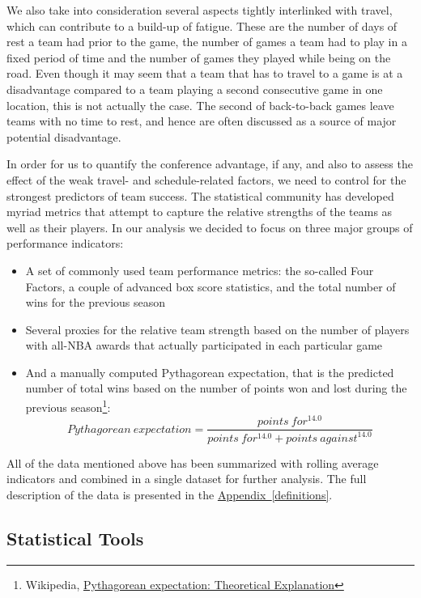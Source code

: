 \documentclass[
    12pt,
    a4paper,
    titlepage,  %
    abstract,  %
    headings=standardclasses,  %
    bibliography=totocnumbered  %
]{scrartcl}
\begin{document}
We also take into consideration several aspects tightly interlinked with travel, which can contribute to a build-up of fatigue. These are the number of days of rest a team had prior to the game, the number of games a team had to play in a fixed period of time and the number of games they played while being on the road. Even though it may seem that a team that has to travel to a game is at a disadvantage compared to a team playing a second consecutive game in one location, this is not actually the case. The second of back-to-back games leave teams with no time to rest, and hence are often discussed as a source of major potential disadvantage.

In order for us to quantify the conference advantage, if any, and also to assess the effect of the weak travel- and schedule-related factors, we need to control for the strongest predictors of team success. The statistical community has developed myriad metrics that attempt to capture the relative strengths of the teams as well as their players. In our analysis we decided to focus on three major groups of performance indicators:

\begin{itemize}
    \item A set of commonly used team performance metrics: the so-called Four Factors, a couple of advanced box score statistics, and the total number of wins for the previous season
    \item Several proxies for the relative team strength based on the number of players with all-NBA awards that actually participated in each particular game
    \item And a manually computed Pythagorean expectation, that is the predicted number of total wins based on the number of points won and lost during the previous season\footnote{Wikipedia, \href{https://en.wikipedia.org/wiki/Pythagorean_expectation\#Theoretical_explanation}{Pythagorean expectation: Theoretical Explanation}}:
    \[
        Pythagorean\ expectation = \frac{points\ for^{14.0}}{points\ for^{14.0} + points\ against^{14.0}}
    \]
\end{itemize}

All of the data mentioned above has been summarized with rolling average indicators and combined in a single dataset for further analysis. The full description of the data is presented in the \hyperref[definitions]{Appendix~\ref*{definitions}}.

\subsection{Statistical Tools}
\end{document}

